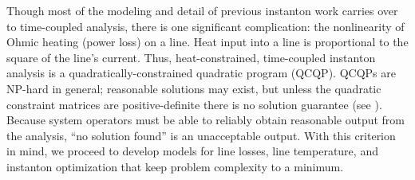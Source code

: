 \documentclass[conference]{IEEEtran}
\begin{document}
Though most of the modeling and detail of previous instanton work carries over to time-coupled analysis, there is one significant complication:  the nonlinearity of Ohmic heating (power loss) on a line. Heat input into a line is proportional to the square of the line's current. Thus, heat-constrained, time-coupled instanton analysis is a quadratically-constrained quadratic program (QCQP). QCQPs are NP-hard in general; reasonable solutions may exist, but unless the quadratic constraint matrices are positive-definite there is no solution guarantee (see \cite{mehanna2014}). Because system operators must be able to reliably obtain reasonable output from the analysis, ``no solution found'' is an unacceptable output. With this criterion in mind, we proceed to develop models for line losses, line temperature, and instanton optimization that keep problem complexity to a minimum.


\end{document}
